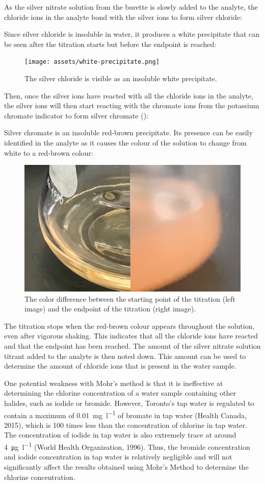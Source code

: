 \documentclass[11pt]{article}
\begin{document}
As the silver nitrate solution from the burette is slowly added to the analyte, the chloride ions in the analyte bond with the silver ions to form silver chloride:

\centerline{}

Since silver chloride is insoluble in water, it produces a white precipitate that can be seen after the titration starts but before the endpoint is reached:

\begin{figure}[H]
	\centering
	\texttt{[image: assets/white-precipitate.png]}
	\caption{The silver chloride is visible as an insoluble white precipitate.}
\end{figure}

Then, once the silver ions have reacted with all the chloride ions in the analyte, the silver ions will then start reacting with the chromate ions from the potassium chromate indicator to form silver chromate ():

\centerline{}

Silver chromate is an insoluble red-brown precipitate. Its presence can be easily identified in the analyte as it causes the colour of the solution to change from white to a red-brown colour:

\begin{figure}[H]
	\centering
	\includegraphics[width=0.3\linewidth]{assets/color-difference}
	\caption{The color difference between the starting point of the titration (left image) and the endpoint of the titration (right image).}
\end{figure}

The titration stops when the red-brown colour appears throughout the solution, even after vigorous shaking. This indicates that all the chloride ions have reacted and that the endpoint has been reached. The amount of the silver nitrate solution titrant added to the analyte is then noted down. This amount can be used to determine the amount of chloride ions that is present in the water sample.

One potential weakness with Mohr's method is that it is ineffective at determining the chlorine concentration of a water sample containing other halides, such as iodide or bromide. However, Toronto's tap water is regulated to contain a maximum of \SI{0.01}{\milli\gram\per\litre} of bromate in tap water (Health Canada, 2015), which is 100 times less than the concentration of chlorine in tap water. The concentration of iodide in tap water is also extremely trace at around \SI{4}{\micro\gram\per\litre} (World Health Organization, 1996). Thus, the bromide concentration and iodide concentration in tap water is relatively negligible and will not significantly affect the results obtained using Mohr's Method to determine the chlorine concentration.
\end{document}
